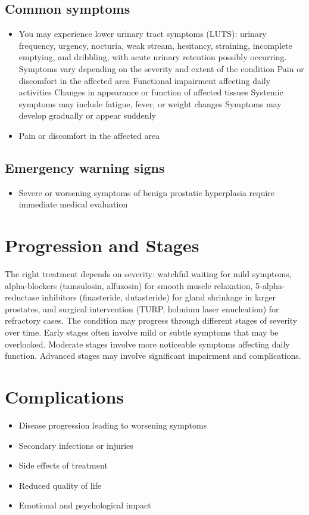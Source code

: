 \subsection{Common symptoms}
\begin{itemize}[noitemsep]
  \item You may experience lower urinary tract symptoms (LUTS): urinary frequency, urgency, nocturia, weak stream, hesitancy, straining, incomplete emptying, and dribbling, with acute urinary retention possibly occurring. Symptoms vary depending on the severity and extent of the condition Pain or discomfort in the affected area Functional impairment affecting daily activities Changes in appearance or function of affected tissues Systemic symptoms may include fatigue, fever, or weight changes Symptoms may develop gradually or appear suddenly
  \item Pain or discomfort in the affected area
  \end{itemize}

\subsection{Emergency warning signs}
\begin{itemize}[noitemsep]
  \item Severe or worsening symptoms of benign prostatic hyperplasia require immediate medical evaluation
\end{itemize}
\section{Progression and Stages}
The right treatment depends on severity: watchful waiting for mild symptoms, alpha-blockers (tamsulosin, alfuzosin) for smooth muscle relaxation, 5-alpha-reductase inhibitors (finasteride, dutasteride) for gland shrinkage in larger prostates, and surgical intervention (TURP, holmium laser enucleation) for refractory cases. The condition may progress through different stages of severity over time. Early stages often involve mild or subtle symptoms that may be overlooked. Moderate stages involve more noticeable symptoms affecting daily function. Advanced stages may involve significant impairment and complications.
\section{Complications}
\begin{itemize}[noitemsep]
  \item Disease progression leading to worsening symptoms
  \item Secondary infections or injuries
  \item Side effects of treatment
  \item Reduced quality of life
  \item Emotional and psychological impact
\end{itemize}
